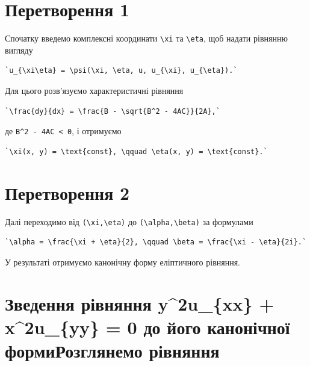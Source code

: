 \documentclass[
  ukrainian,
]{article}
\begin{document}
\section{Перетворення
1}\label{ux43fux435ux440ux435ux442ux432ux43eux440ux435ux43dux43dux44f-1}

Спочатку введемо комплексні координати \texttt{\textbackslash{}xi} та
\texttt{\textbackslash{}eta}, щоб надати рівнянню вигляду

\begin{verbatim}
`u_{\xi\eta} = \psi(\xi, \eta, u, u_{\xi}, u_{\eta}).`
\end{verbatim}

Для цього розв'язуємо характеристичні рівняння

\begin{verbatim}
`\frac{dy}{dx} = \frac{B - \sqrt{B^2 - 4AC}}{2A},`
\end{verbatim}

де \texttt{B\^{}2\ -\ 4AC\ \textless{}\ 0}, і отримуємо

\begin{verbatim}
`\xi(x, y) = \text{const}, \qquad \eta(x, y) = \text{const}.`
\end{verbatim}

\section{Перетворення
2}\label{ux43fux435ux440ux435ux442ux432ux43eux440ux435ux43dux43dux44f-2}

Далі переходимо від \texttt{(\textbackslash{}xi,\textbackslash{}eta)} до
\texttt{(\textbackslash{}alpha,\textbackslash{}beta)} за формулами

\begin{verbatim}
`\alpha = \frac{\xi + \eta}{2}, \qquad \beta = \frac{\xi - \eta}{2i}.`
\end{verbatim}

У результаті отримуємо канонічну форму еліптичного рівняння.

\section{Зведення рівняння y\^{}2u\_\{xx\} + x\^{}2u\_\{yy\} = 0 до його
канонічної формиРозглянемо
рівняння}\label{ux437ux432ux435ux434ux435ux43dux43dux44f-ux440ux456ux432ux43dux44fux43dux43dux44f-y2u_xx-x2u_yy-0-ux434ux43e-ux439ux43eux433ux43e-ux43aux430ux43dux43eux43dux456ux447ux43dux43eux457-ux444ux43eux440ux43cux438ux440ux43eux437ux433ux43bux44fux43dux435ux43cux43e-ux440ux456ux432ux43dux44fux43dux43dux44f}
\end{document}
